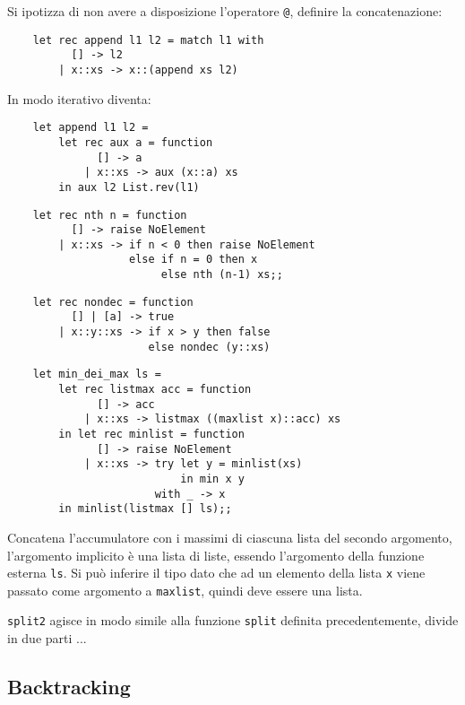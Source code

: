 \documentclass{article}
\numberwithin{equation}{subsection}
\begin{document}
Si ipotizza di non avere a disposizione l'operatore \verb|@|, definire la concatenazione:
\begin{verbatim}
    let rec append l1 l2 = match l1 with
          [] -> l2
        | x::xs -> x::(append xs l2) 
\end{verbatim}
In modo iterativo diventa:
\begin{verbatim}
    let append l1 l2 =
        let rec aux a = function
              [] -> a
            | x::xs -> aux (x::a) xs
        in aux l2 List.rev(l1)
\end{verbatim}


\begin{verbatim}
    let rec nth n = function
          [] -> raise NoElement
        | x::xs -> if n < 0 then raise NoElement
                   else if n = 0 then x
                        else nth (n-1) xs;;
\end{verbatim}


\begin{verbatim}
    let rec nondec = function
          [] | [a] -> true
        | x::y::xs -> if x > y then false
                      else nondec (y::xs)
\end{verbatim}



\begin{verbatim}
    let min_dei_max ls = 
        let rec listmax acc = function
              [] -> acc
            | x::xs -> listmax ((maxlist x)::acc) xs
        in let rec minlist = function
              [] -> raise NoElement
            | x::xs -> try let y = minlist(xs)
                           in min x y
                       with _ -> x
        in minlist(listmax [] ls);;
\end{verbatim}

Concatena l'accumulatore con i massimi di ciascuna lista del secondo argomento, l'argomento implicito è una lista di liste, essendo l'argomento della funzione esterna \verb|ls|. Si può inferire il tipo dato che ad un elemento della lista \verb|x| viene passato come argomento a \verb|maxlist|, quindi deve essere una lista. 



\verb|split2| agisce in modo simile alla funzione \verb|split| definita precedentemente, divide in due parti ...

\subsection{Backtracking}
\end{document}
